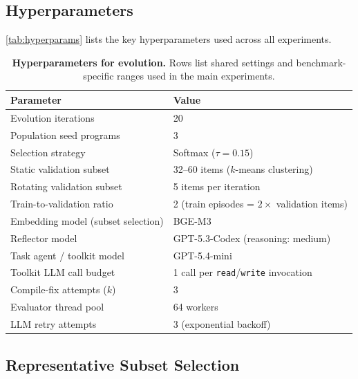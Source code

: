 
\FloatBarrier

\subsection{Hyperparameters}
\label{app:hyperparameters}

\autoref{tab:hyperparams} lists the key hyperparameters used across all experiments.

\begin{table}[!htbp]
\centering
\caption{\textbf{Hyperparameters for \sysname{} evolution.}
Rows list shared settings and benchmark-specific ranges used in the main experiments.}
\label{tab:hyperparams}
\small
\begin{tabular}{@{}ll@{}}
\toprule
\textbf{Parameter} & \textbf{Value} \\
\midrule
Evolution iterations         & 20 \\
Population seed programs     & 3 \\
Selection strategy           & Softmax ($\tau=0.15$) \\
Static validation subset     & 32--60 items ($k$-means clustering) \\
Rotating validation subset   & 5 items per iteration \\
Train-to-validation ratio    & 2 (train episodes = $2 \times$ validation items) \\
Embedding model (subset selection) & BGE-M3~\citep{bge_m3} \\
Reflector model              & GPT-5.3-Codex (reasoning: medium) \\
Task agent / toolkit model   & GPT-5.4-mini \\
Toolkit LLM call budget      & 1 call per \texttt{read}/\texttt{write} invocation \\
Compile-fix attempts ($k$)   & 3 \\
Evaluator thread pool        & 64 workers \\
LLM retry attempts           & 3 (exponential backoff) \\
\bottomrule
\end{tabular}
\end{table}

\subsection{Representative Subset Selection}
\label{app:representative-subset}


